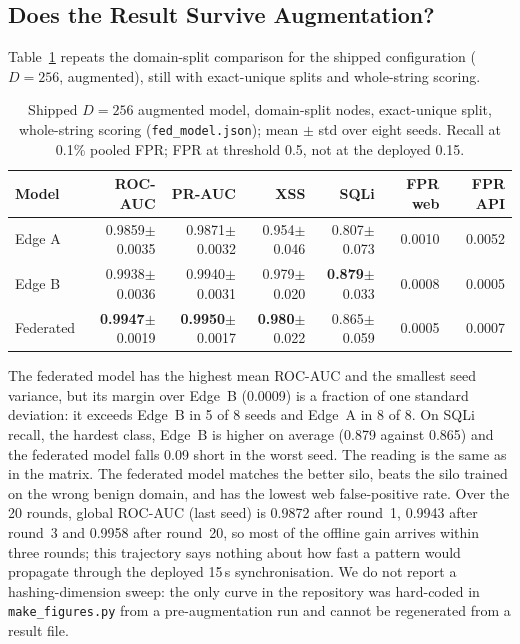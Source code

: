\subsection{Does the Result Survive Augmentation?}
\label{sec:eval-detection}

Table~\ref{tab:eval-detection} repeats the domain-split comparison for the shipped configuration ($D=256$, augmented), still with exact-unique splits and whole-string scoring.

\begin{table}[t]
\centering
\caption{Shipped $D{=}256$ augmented model, domain-split nodes, exact-unique split, whole-string scoring (\texttt{fed\_model.json}); mean $\pm$ std over eight seeds. Recall at 0.1\% pooled FPR; FPR at threshold 0.5, not at the deployed 0.15.}
\label{tab:eval-detection}
\small
\begin{tabular}{@{}lrrrrrr@{}}
\toprule
\textbf{Model} & \textbf{ROC-AUC} & \textbf{PR-AUC} & \textbf{XSS} & \textbf{SQLi} & \textbf{FPR web} & \textbf{FPR API} \\ \midrule
Edge A & 0.9859$\pm$0.0035 & 0.9871$\pm$0.0032 & 0.954$\pm$0.046 & 0.807$\pm$0.073 & 0.0010 & 0.0052 \\
Edge B & 0.9938$\pm$0.0036 & 0.9940$\pm$0.0031 & 0.979$\pm$0.020 & \textbf{0.879}$\pm$0.033 & 0.0008 & 0.0005 \\
Federated & \textbf{0.9947}$\pm$0.0019 & \textbf{0.9950}$\pm$0.0017 & \textbf{0.980}$\pm$0.022 & 0.865$\pm$0.059 & 0.0005 & 0.0007 \\ \bottomrule
\end{tabular}
\end{table}

The federated model has the highest mean ROC-AUC and the smallest seed variance, but its margin over Edge~B (0.0009) is a fraction of one standard deviation: it exceeds Edge~B in 5 of 8 seeds and Edge~A in 8 of 8. On SQLi recall, the hardest class, Edge~B is higher on average (0.879 against 0.865) and the federated model falls 0.09 short in the worst seed. The reading is the same as in the matrix. The federated model matches the better silo, beats the silo trained on the wrong benign domain, and has the lowest web false-positive rate. Over the 20 rounds, global ROC-AUC (last seed) is 0.9872 after round~1, 0.9943 after round~3 and 0.9958 after round~20, so most of the offline gain arrives within three rounds; this trajectory says nothing about how fast a pattern would propagate through the deployed 15\,s synchronisation. We do not report a hashing-dimension sweep: the only curve in the repository was hard-coded in \texttt{make\_figures.py} from a pre-augmentation run and cannot be regenerated from a result file.

